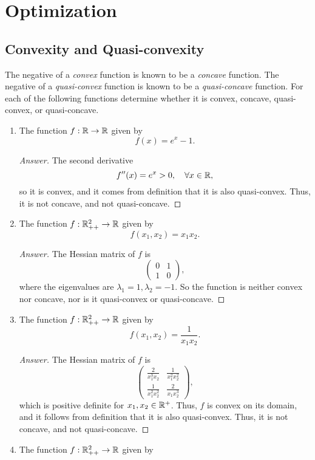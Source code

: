\chapter{Optimization}


\section{Convexity and Quasi-convexity}
The negative of a \emph{convex} function is known to be a \emph{concave} function.
The negative of a \emph{quasi-convex} function is known to be a \emph{quasi-concave} function.
For each of the following functions determine whether it is convex, concave, quasi-convex, or quasi-concave.
\begin{enumerate}
	\item The function \(f: \mathbb{R} \to \mathbb{R}\) given by
	\[ f(x)=e^x-1. \]
	\begin{proof}[Answer]
	The second derivative
	\[ f''(x)=e^x>0,\quad \forall x\in\mathbb{R}, \]
	so it is convex, and it comes from definition that it is also quasi-convex.
	Thus, it is not concave, and not quasi-concave.
	\end{proof}
	\item The function \(f: \mathbb{R}_{++}^2 \to \mathbb{R}\) given by
	\[ f(x_1,x_2)=x_1 x_2. \]
	\begin{proof}[Answer]
	The Hessian matrix of \(f\) is
	\[ \begin{pmatrix} 0 & 1 \\ 1 & 0 \end{pmatrix}, \]
	where the eigenvalues are \(\lambda_1=1,\lambda_2=-1\).
	So the function is neither convex nor concave, nor is it quasi-convex or quasi-concave.
	\end{proof}
	\item The function \(f: \mathbb{R}_{++}^2 \to \mathbb{R}\) given by
	\[ f(x_1,x_2)=\frac{1}{x_1 x_2}. \]
	\begin{proof}[Answer]
	The Hessian matrix of \(f\) is
	\[ \begin{pmatrix} \frac{2}{x_1^3 x_2} & \frac{1}{x_1^2 x_2^2} \\ \frac{1}{x_1^2 x_2^2} & \frac{2}{x_1 x_2^3} \end{pmatrix}, \]
	which is positive definite for \(x_1,x_2\in\mathbb{R}^{+}\).
	Thus, \(f\) is convex on its domain, and it follows from definition that it is also quasi-convex.
	Thus, it is not concave, and not quasi-concave.
	\end{proof}
	\item The function \(f: \mathbb{R}_{++}^2 \to \mathbb{R}\) given by

\end{enumerate}
